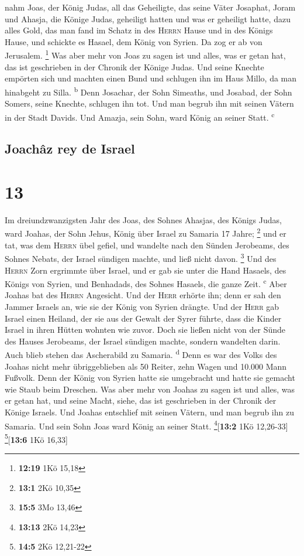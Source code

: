  nahm Joas, der König Judas, all das Geheiligte, das
seine Väter Josaphat, Joram und Ahasja, die Könige Judas, geheiligt
hatten und was er geheiligt hatte, dazu alles Gold, das man fand im
Schatz in des \textsc{Herrn} Hause und in des Königs Hause, und schickte
es Hasael, dem König von Syrien. Da zog er ab von Jerusalem. \footnote{\textbf{12:19}
  1Kö 15,18}  Was aber mehr von Joas zu sagen ist und
alles, was er getan hat, das ist geschrieben in der Chronik der Könige
Judas.  Und seine Knechte empörten sich und machten einen
Bund und schlugen ihn im Haus Millo, da man hinabgeht zu Silla.
\textsuperscript{b}  Denn Josachar, der Sohn Simeaths,
und Josabad, der Sohn Somers, seine Knechte, schlugen ihn tot. Und man
begrub ihn mit seinen Vätern in der Stadt Davids. Und Amazja, sein Sohn,
ward König an seiner Statt. \textsuperscript{c}

\hypertarget{joachuxe2z-rey-de-israel}{%
\subsection{Joachâz rey de Israel}\label{joachuxe2z-rey-de-israel}}

\hypertarget{section-12}{%
\section{13}\label{section-12}}

 Im dreiundzwanzigsten Jahr des Joas, des Sohnes Ahasjas,
des Königs Judas, ward Joahas, der Sohn Jehus, König über Israel zu
Samaria 17 Jahre; \footnote{\textbf{13:1} 2Kö 10,35}  und
er tat, was dem \textsc{Herrn} übel gefiel, und wandelte nach den Sünden
Jerobeams, des Sohnes Nebats, der Israel sündigen machte, und ließ nicht
davon. \footnote{\textbf{15:5} 3Mo 13,46}  Und des
\textsc{Herrn} Zorn ergrimmte über Israel, und er gab sie unter die Hand
Hasaels, des Königs von Syrien, und Benhadads, des Sohnes Hasaels, die
ganze Zeit. \textsuperscript{c}  Aber Joahas bat des
\textsc{Herrn} Angesicht. Und der \textsc{Herr} erhörte ihn; denn er sah
den Jammer Israels an, wie sie der König von Syrien drängte.
 Und der \textsc{Herr} gab Israel einen Heiland, der sie
aus der Gewalt der Syrer führte, dass die Kinder Israel in ihren Hütten
wohnten wie zuvor.  Doch sie ließen nicht von der Sünde
des Hauses Jerobeams, der Israel sündigen machte, sondern wandelten
darin. Auch blieb stehen das Ascherabild zu Samaria. \textsuperscript{d}
 Denn es war des Volks des Joahas nicht mehr
übriggeblieben als 50 Reiter, zehn Wagen und 10.000 Mann Fußvolk. Denn
der König von Syrien hatte sie umgebracht und hatte sie gemacht wie
Staub beim Dreschen.  Was aber mehr von Joahas zu sagen
ist und alles, was er getan hat, und seine Macht, siehe, das ist
geschrieben in der Chronik der Könige Israels.  Und Joahas
entschlief mit seinen Vätern, und man begrub ihn zu Samaria. Und sein
Sohn Joas ward König an seiner Statt. \footnote{\textbf{13:13} 2Kö 14,23}{[}\textbf{13:2}
1Kö 12,26-33{]} \footnote{\textbf{14:5} 2Kö 12,21-22}{[}\textbf{13:6}
1Kö 16,33{]}

